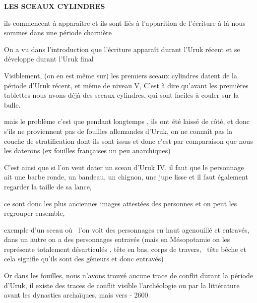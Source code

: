 \documentclass[a4paper]{article}
\begin{document}
\bigskip


\bigskip


\bigskip

{
\textbf{LES SCEAUX CYLINDRES}}


\bigskip


\bigskip

{
ils commencent à apparaître et ils sont liés à l'apparition de
l'écriture à là nous sommes dans une période charnière}

{
On a vu dans l'introduction que l'écriture apparaît durant l'Uruk récent
et se développe durant l'Uruk final}


\bigskip

{
Visiblement, (on en est même sur) les premiers sceaux cylindres datent
de la période d'Uruk récent, et même de niveau V, C'est à dire qu'avant
les premières tablettes nous avons déjà des sceaux cylindres, qui sont
faciles à couler sur la bulle.}


\bigskip

{
mais le problème c'est que pendant longtemps , ils ont été laissé de
côté, et donc s'ils ne proviennent pas de fouilles allemandes d'Uruk,
on ne connaît pas la couche de stratification dont ils sont issus et
donc c'est par comparaison que nous les daterons (ex fouilles
françaises un peu anarchiques)}


\bigskip

{
C'est ainsi que si l'on veut dater un sceau d'Uruk IV, il faut que le
personnage ait une barbe ronde, un bandeau, un chignon, une jupe lisse
et il faut également regarder la taille de sa lance, }

{
ce sont donc les plus anciennes images attestées des personnes et on
peut les regrouper ensemble, }


\bigskip

{
exemple d'un sceau où \ l'on voit des personnages en haut agenouillé et
entravés, dans un autre on a des personnages entravés (mais en
Mésopotamie on les représente totalement désarticulés , tête en bas,
corps de travers, \ tête bêche et cela signifie qu'ils sont des gêneurs
et donc entravés)}


\bigskip

{
Or dans les fouilles, nous n'avons trouvé aucune trace de conflit durant
la période d'Uruk, il existe des traces de conflit visible
l'archéologie ou par la littérature avant les dynasties archaïques,
mais vers - 2600.}
\end{document}
